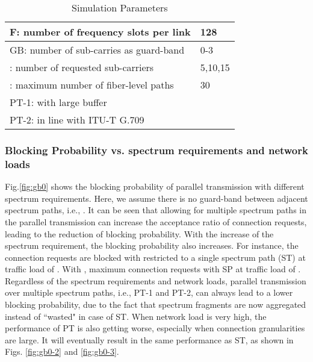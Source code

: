 \documentclass[conference]{IEEEtran}
\begin{document}
 \begin{table}
\centering
   \caption{Simulation Parameters } \label{tab:para}
\begin{tabular}{ | l | l | }
        \hline
         F: number of frequency slots per link &128 \\
        \hline
  GB: number of sub-carries  as guard-band&  0-3\\ \hline
 : number of requested sub-carriers& 5,10,15\\ \hline
 : maximum number of fiber-level paths &30  \\ \hline
PT-1:   with large buffer & \\
PT-2:   in line with ITU-T G.709& 	 \\ \hline              
        \end{tabular}
\end{table}
 
 

\subsubsection{Blocking Probability  vs. spectrum requirements and network loads} Fig.\ref{fig:gb0} shows the 
blocking probability of parallel transmission with different spectrum requirements. Here, we assume there is no guard-band between adjacent spectrum paths, i.e., . It can be seen that allowing for multiple spectrum paths in the 
parallel transmission can increase the acceptance ratio of connection requests, leading to the reduction of blocking 
probability.  With the increase of the spectrum requirement, the blocking probability also increases. For instance, the 
 connection requests are blocked with  restricted to a single spectrum path (ST) at traffic load of . With , maximum  connection requests with SP at traffic load of . Regardless of the spectrum requirements and network loads, parallel transmission over multiple spectrum paths, i.e., PT-1 and PT-2, can always lead to a lower blocking probability, due to the fact that spectrum fragments are now aggregated instead of ``wasted" in case of ST. When network load is very high, the performance of PT is also getting worse, especially when connection granularities are large. It will eventually result in the same performance as ST, as shown in Figs. \ref{fig:gb0-2} and \ref{fig:gb0-3}.
\end{document}
